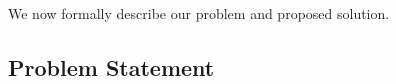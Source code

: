 \documentclass[twoside]{article}
\DeclareMathOperator*{\argmax}{arg\,max}
\newcommand{\Y}{\mathcal{Y}}
\newcommand{\X}{\mathcal{X}}
\newcommand{\x}{\mathbf{x}}
\newcommand{\w}{\theta}
\newcommand{\wmle}{\hat\w^{mle}}
\newcommand{\trans}[1]{\ensuremath{{#1}^{\mathsf{T}}}}
\begin{document}


We now formally describe our problem and proposed solution.

\subsection{Problem Statement}

\end{document}
